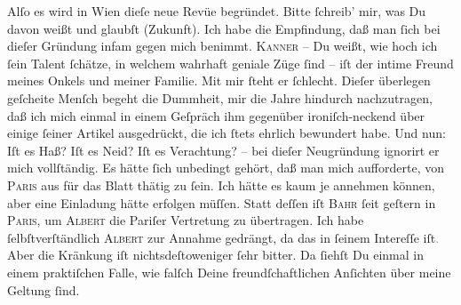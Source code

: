 \pstart
           Alſo es \strikeout{\textcolor{gray}{wa}} wird in Wien dieſe neue Revüe begründet. Bitte{ }ſchreib’ mir, was Du
               davon weißt und glaubſt (Zukunft). Ich habe die Empfindung, daß man{ }ſich bei dieſer
               Gründung infam gegen mich benimmt. \textsc{Kanner} – Du weißt, wie hoch ich{ }ſein Talent{ }ſchätze, in welchem {\pb}wahrhaft geniale Züge{ }ſind – iſt der intime Freund meines Onkels und meiner Familie. Mit
               mir{ }ſteht er{ }ſchlecht. Dieſer überlegen geſcheite Menſch begeht die Dummheit, mir die Jahre hindurch
               nachzutragen, daß ich mich einmal in einem Geſpräch  ihm gegenüber ironiſch-neckend über einige{ }ſeiner Artikel ausgedrückt,
               die ich{ }ſtets ehrlich bewundert habe. Und nun: Iſt es Haß? Iſt es Neid? Iſt es
               Verachtung? – bei dieſer Neugründung ignorirt er mich vollſtändig. Es hätte {\pb}ſich unbedingt gehört, daß man mich aufforderte, von
                  \textsc{Paris} aus für das Blatt thätig
               zu{ }ſein. Ich hätte es kaum je annehmen können, aber eine Einladung hätte erfolgen
               müſſen. Statt deſſen iſt \textsc{Bahr}{ }ſeit geſtern in \textsc{Paris}, um \textsc{Albert} die Pariſer Vertretung zu übertragen. Ich
               habe{ }ſelbſtverſtändlich \textsc{Albert} zur Annahme gedrängt, da das in{ }ſeinem Intereſſe iſt\textcolor{gray}{.} Aber
               die Kränkung iſt nichtsdeſtoweniger{ }ſehr bitter. Da{ }ſiehſt Du einmal in einem
               praktiſchen Falle, wie falſch Deine freundſchaftlichen Anſichten über meine Geltung{ }ſind.\pend
           
